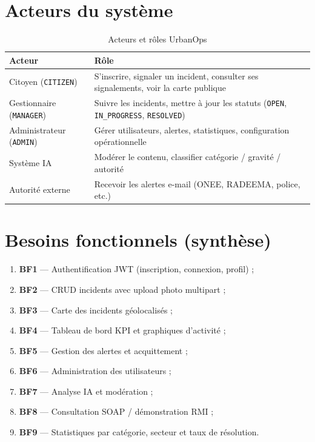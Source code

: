 \documentclass[12pt,a4paper,oneside]{report}
\begin{document}
\section{Acteurs du système}

\begin{table}[H]
  \centering
  \caption{Acteurs et rôles UrbanOps}
  \label{tab:acteurs}
  \begin{tabular}{@{}p{3.2cm}p{9.5cm}@{}}
    \toprule
    \textbf{Acteur} & \textbf{Rôle} \\
    \midrule
    Citoyen (\texttt{CITIZEN}) & S'inscrire, signaler un incident, consulter ses signalements, voir la carte publique \\
    Gestionnaire (\texttt{MANAGER}) & Suivre les incidents, mettre à jour les statuts (\texttt{OPEN}, \texttt{IN\_PROGRESS}, \texttt{RESOLVED}) \\
    Administrateur (\texttt{ADMIN}) & Gérer utilisateurs, alertes, statistiques, configuration opérationnelle \\
    Système IA & Modérer le contenu, classifier catégorie / gravité / autorité \\
    Autorité externe & Recevoir les alertes e-mail (ONEE, RADEEMA, police, etc.) \\
    \bottomrule
  \end{tabular}
\end{table}

\section{Besoins fonctionnels (synthèse)}

\begin{enumerate}[leftmargin=*]
  \item \textbf{BF1} — Authentification JWT (inscription, connexion, profil) ;
  \item \textbf{BF2} — CRUD incidents avec upload photo multipart ;
  \item \textbf{BF3} — Carte des incidents géolocalisés ;
  \item \textbf{BF4} — Tableau de bord KPI et graphiques d'activité ;
  \item \textbf{BF5} — Gestion des alertes et acquittement ;
  \item \textbf{BF6} — Administration des utilisateurs ;
  \item \textbf{BF7} — Analyse IA et modération ;
  \item \textbf{BF8} — Consultation SOAP / démonstration RMI ;
  \item \textbf{BF9} — Statistiques par catégorie, secteur et taux de résolution.
\end{enumerate}
\end{document}
